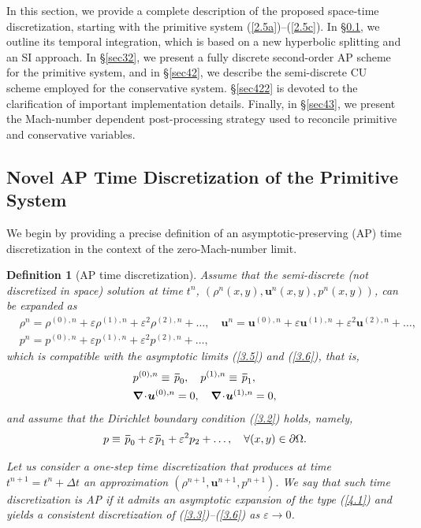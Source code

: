 \documentclass[A4paper,12pt,twoside]{article}
\newtheorem{definition}{Definition}[section]
\numberwithin{equation}{section}
\numberwithin{figure}{section}
\numberwithin{table}{section}
\def\bnabla{\bm{\nabla}}
\newcommand{\dt}{\Delta t}
\newcommand{\ve}{\varepsilon}
\newcommand\eref[1]{(\ref{#1})}
\newcommand*\xbar[1]{%
  \hbox{%
    \vbox{%
      \hrule height 0.5pt %
      \kern0.4ex%
      \hbox{%
        \kern-0.05em%
        \ensuremath{#1}%
        \kern-0.00em%
      }%
    }%
  }%
}
\begin{document}
In this section, we provide a complete description of the proposed space-time discretization, starting with the primitive system
\eref{2.5a}–\eref{2.5c}. In \S\ref{sec411}, we outline its temporal integration, which is based on a new hyperbolic splitting and an SI
approach. In \S\ref{sec32}, we present a fully discrete second-order AP scheme for the primitive system, and in \S\ref{sec42}, we describe
the semi-discrete CU scheme employed for the conservative system. \S\ref{sec422} is devoted to the clarification of important
implementation details. Finally, in \S\ref{sec43}, we present the Mach-number dependent post-processing strategy used to reconcile primitive
and conservative variables.

\subsection{Novel AP Time Discretization of the Primitive System}\label{sec411}
We begin by providing a precise definition of an asymptotic-preserving (AP) time discretization in the context of the zero-Mach-number
limit.
\begin{definition}[AP time discretization]\label{def41}
Assume that the {\color{black}semi-discrete (not discretized in space) solution at time $t^n$, $(\rho^n(x,y),\bm u^n(x,y),p^n(x,y))$,} can be
expanded as
\begin{equation}
\begin{aligned}
&\rho^n=\rho^{(0),n}+\ve\rho^{(1),n}+\ve^2\rho^{(2),n}+\dots,\quad\bm u^n=\bm u^{(0),n}+\ve\bm u^{(1),n}+\ve^2\bm u^{(2),n}+\dots,\\
&p^n=p^{(0),n}+\ve p^{(1),n}+\ve^2p^{(2),n}+\dots,
\end{aligned}
\label{4.1}
\end{equation}
which is compatible with the asymptotic limits \eref{3.5} and \eref{3.6}, that is,
\begin{align}
&p^{(0),n}\equiv\,\xbar p_0,\quad p^{(1),n}\equiv\,\xbar p_1,\label{3.2f}\\
&\bnabla\!\cdot\!\bm u^{(0),n}=0,\quad\bnabla\!\cdot\!\bm u^{(1),n}=0,\label{4.2}
\end{align}
and assume that the Dirichlet boundary condition \eref{3.2} holds, namely,
\begin{equation}
p\equiv\,\xbar p_0+\ve\,\xbar p_1+\ve^2p_2+\dots,\quad\forall(x,y)\in\partial\Omega.
\label{3.4f}
\end{equation}

Let us consider a one-step time discretization that produces at time $t^{n+1}=t^n+\dt$ an approximation $(\rho^{n+1},\bm u^{n+1},p^{n+1})$.
We say that such time discretization is AP if it admits an asymptotic expansion of the type \eref{4.1} and yields a consistent
discretization of \eref{3.3}--\eref{3.6} as $\ve\to0$.
\end{definition}
\end{document}
